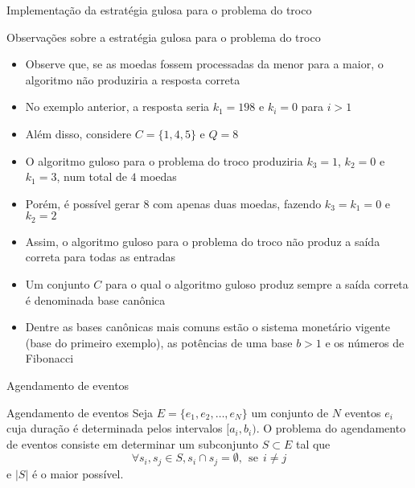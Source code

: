 \begin{frame}[fragile]{Implementação da estratégia gulosa para o problema do troco}
\end{frame}

\begin{frame}[fragile]{Observações sobre a estratégia gulosa para o problema do troco}

    \begin{itemize}
        \item Observe que, se as moedas fossem processadas da menor para a maior, o algoritmo
            não produziria a resposta correta

        \item No exemplo anterior, a resposta seria $k_1 = 198$ e $k_i = 0$ para $i > 1$

        \item Além disso, considere $C = \lbrace 1, 4, 5\rbrace$ e $Q = 8$

        \item O algoritmo guloso para o problema do troco produziria $k_3 = 1$, $k_2 = 0$ e 
            $k_1 = 3$, num total de $4$ moedas

        \item Porém, é possível gerar $8$ com apenas duas moedas, fazendo $k_3 = k_1 = 0$ e 
            $k_2 = 2$

        \item Assim, o algoritmo guloso para o problema do troco não produz a saída correta para
            todas as entradas

        \item Um conjunto $C$ para o qual o algoritmo guloso produz sempre a saída correta é
            denominada base canônica

        \item Dentre as bases canônicas mais comuns estão o sistema monetário vigente (base do
            primeiro exemplo), as potências de uma base $b > 1$ e os números de Fibonacci
        
    \end{itemize}

\end{frame}

\begin{frame}[fragile]{Agendamento de eventos}

    \begin{block}{Agendamento de eventos}
        Seja $E = \lbrace e_1, e_2, \ldots, e_N\rbrace$ um conjunto de $N$ eventos $e_i$ cuja
            duração é determinada pelos intervalos $[a_i, b_i)$. O problema do agendamento de
            eventos consiste em determinar um subconjunto $S\subset E$ tal que
        \[
            \forall s_i, s_j\in S, s_i \cap s_j = \emptyset, \ \ \mbox{se}\ \ i\neq j
        \]
        e $|S|$ é o maior possível.
    \end{block}

\end{frame}

